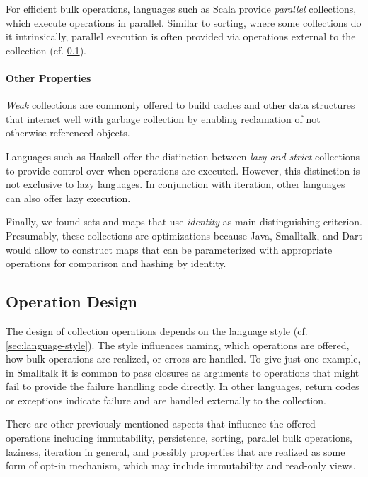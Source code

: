 \documentclass[sigconf, authorversion]{acmart}
\begin{document}
For efficient bulk operations,
languages such as Scala provide \emph{parallel} collections,
which execute operations in parallel.
Similar to sorting, where some collections do it intrinsically,
parallel execution is often provided via operations
external to the collection (cf. \cref{sec:operations}).

\paragraph{Other Properties}

\emph{Weak} collections are commonly offered to build caches
and other data structures that interact well with garbage collection
by enabling reclamation of not otherwise referenced objects.

Languages such as Haskell offer the distinction between \emph{lazy and strict}
collections to provide control over when operations are executed.
However, this distinction is not exclusive to lazy languages.
In conjunction with iteration,
other languages can also offer lazy execution.


Finally, we found sets and maps
that use \emph{identity} as main distinguishing criterion.
Presumably, these collections are optimizations
because Java, Smalltalk, and Dart would allow to construct
maps that can be parameterized with appropriate operations
for comparison and hashing by identity.

\subsection{Operation Design}
\label{sec:operations}

The design of collection operations depends
on the language style (cf. \cref{sec:language-style}).
The style influences naming, which operations are offered,
how bulk operations are realized, or errors are handled.
To give just one example, in Smalltalk it is common to pass closures as arguments
to operations that might fail to provide the failure handling code directly.
In other languages, return codes or exceptions indicate failure
and are handled externally to the collection.

There are other previously mentioned aspects
that influence the offered operations including immutability, persistence,
sorting, parallel bulk operations, laziness, iteration in general,
and possibly properties that are realized as some form of opt-in mechanism,
which may include immutability and read-only views.
\end{document}
